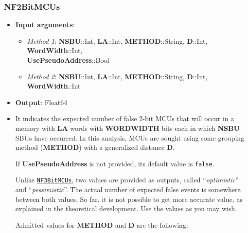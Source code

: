 \subsubsection*{NF2BitMCUs}\label{Fun:NF2BitMCUs}
%
\begin{itemize}
	\item \textbf{Input arguments}: 
	\begin{itemize}
		\item \textit{Method 1}: \textbf{NSBU}::Int, \textbf{LA}::Int, \textbf{METHOD}::String, \textbf{D}::Int, \textbf{WordWidth}::Int,\\ \textbf{UsePseudoAddress}::Bool
		\item \textit{Method 2}: \textbf{NSBU}::Int, \textbf{LA}::Int, \textbf{METHOD}::String, \textbf{D}::Int, \textbf{WordWidth}::Int
	\end{itemize}
	\item \textbf{Output}: Float64
	\item It indicates the expected number of false 2-bit MCUs that will occur 
	in a memory with \textbf{LA} words with \textbf{WORDWIDTH} bits each in which \textbf{NSBU} SBUs have occurred. In this analysis, 
	MCUs are sought using some grouping method (\textbf{METHOD}) with a generalized distance \textbf{D}.
	
	If \textbf{UsePseudoAddress} is not provided, its default value is \texttt{false}.
	
	Unlike \hyperref[Fun:NF3BitMCUs]{\texttt{NF3BitMCUs}}, two values are provided as outputs, called  ``\textit{optimistic}'' and ``\textit{pessimistic}''. The actual number of expected false events is somewhere between both values. So far, it is not possible to get  more accurate value, as explained in the theoretical development. Use the values as you may wish.
	
	Admitted values for \textbf{METHOD} and \textbf{D} are the following:
	

\end{itemize}
